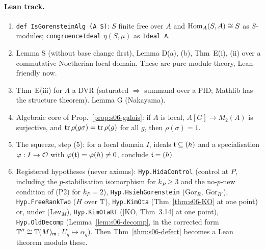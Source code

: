 \paragraph{Lean track.}
\begin{enumerate}[label=L\arabic*.]
\item \texttt{def IsGorensteinAlg (A S)}: $S$ finite free over $A$ and $\operatorname{Hom}_A(S,A)\cong S$ as $S$-modules; \texttt{congruenceIdeal}
  $\eta(S,\mu)$ as \texttt{Ideal A}.
\item Lemma S (without base change first), Lemma D(a), (b), Thm~E(i), (ii) over a commutative Noetherian local domain. These are pure
  module theory, Lean-friendly now.
\item Thm~E(iii) for $A$ a DVR (saturated $\Rightarrow$ summand over a PID; Mathlib has the structure theorem). Lemma G (Nakayama).
\item Algebraic core of Prop.~\ref{prop:s06-galois}: if $A$ is local, $A[G]\to M_2(A)$ is surjective, and $\operatorname{tr}\rho(g\sigma)=\operatorname{tr}\rho(g)$
  for all $g$, then $\rho(\sigma)=1$.
\item The squeeze, step (5): for a local domain $I$, ideals $\mathfrak{t}\subseteq(h)$ and a specialisation $\varphi:I\to\mathcal{O}$ with
  $\varphi(\mathfrak{t})=\varphi(h)\ne0$, conclude $\mathfrak{t}=(h)$.
\item Registered hypotheses (never axioms): \texttt{Hyp.HidaControl} (control at $P$, including the $p$-stabilisation
  isomorphism for $k_P\ge3$ and the no-$p$-new condition of (P2) for $k_P=2$), \texttt{Hyp.HsiehGorenstein} (Gor$_R$, Gor$_{R'}$),
  \texttt{Hyp.FreeRankTwo} ($H$ over $\mathbb{T}$), \texttt{Hyp.KimOta} (Thm~\ref{thm:s06-KO} at one point) or, under (Lev$_M$),
  \texttt{Hyp.KimOtaRT} ([KO, Thm~3.14] at one point), \texttt{Hyp.OldDecomp}
  (Lemma~\ref{lem:s06-decomp}, in the corrected form $\mathbb{T}''\cong\mathbb{T}(M)_{\mathfrak{m}}$, $U_q\mapsto\alpha_q$).  Then Thm~\ref{thm:s06-defect} becomes a Lean theorem modulo these.
\end{enumerate}

